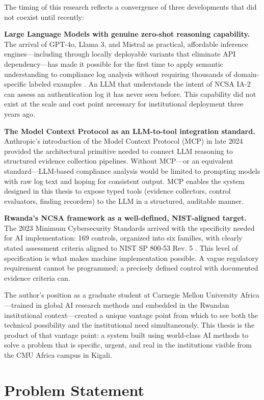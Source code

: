 \documentclass[12pt,oneside]{report}
\begin{document}
The timing of this research reflects a convergence of three developments that did not coexist until recently:

\textbf{Large Language Models with genuine zero-shot reasoning capability.} The arrival of GPT-4o, Llama 3, and Mistral as practical, affordable inference engines—including through locally deployable variants that eliminate API dependency—has made it possible for the first time to apply semantic understanding to compliance log analysis without requiring thousands of domain-specific labeled examples \cite{karlsen2024}. An LLM that understands the intent of NCSA IA-2 can assess an authentication log it has never seen before. This capability did not exist at the scale and cost point necessary for institutional deployment three years ago.

\textbf{The Model Context Protocol as an LLM-to-tool integration standard.} Anthropic's introduction of the Model Context Protocol (MCP) in late 2024 \cite{mcp_anthropic} provided the architectural primitive needed to connect LLM reasoning to structured evidence collection pipelines. Without MCP—or an equivalent standard—LLM-based compliance analysis would be limited to prompting models with raw log text and hoping for consistent output. MCP enables the system designed in this thesis to expose typed tools (evidence collectors, control evaluators, finding recorders) to the LLM in a structured, auditable manner.

\textbf{Rwanda's NCSA framework as a well-defined, NIST-aligned target.} The 2023 Minimum Cybersecurity Standards \cite{ncsa2023} arrived with the specificity needed for AI implementation: 169 controls, organized into six families, with clearly stated assessment criteria aligned to NIST SP 800-53 Rev. 5 \cite{nist2020}. This level of specification is what makes machine implementation possible. A vague regulatory requirement cannot be programmed; a precisely defined control with documented evidence criteria can.

The author's position as a graduate student at Carnegie Mellon University Africa—trained in global AI research methods and embedded in the Rwandan institutional context—created a unique vantage point from which to see both the technical possibility and the institutional need simultaneously. This thesis is the product of that vantage point: a system built using world-class AI methods to solve a problem that is specific, urgent, and real in the institutions visible from the CMU Africa campus in Kigali.

\section{Problem Statement}
\end{document}

